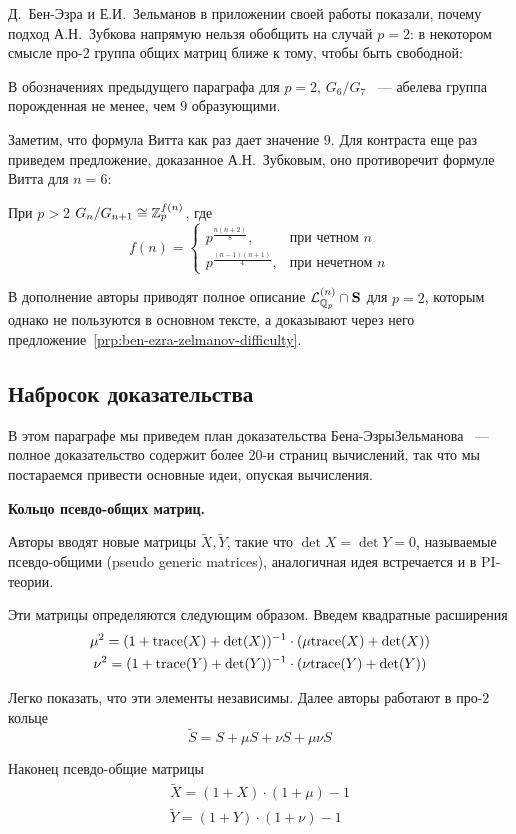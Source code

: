 Д.\ Бен-Эзра и Е.И.\ Зельманов в приложении своей работы показали, почему подход А.Н.\ Зубкова напрямую нельзя обобщить на случай $p=2$: в некотором смысле про-$2$ группа общих матриц ближе к тому, чтобы быть свободной:
\begin{proposition}
    \label{prp:ben-ezra-zelmanov-difficulty}
    В обозначениях предыдущего параграфа для $p=2$, $G_6 / G_7$ ~--- абелева группа порожденная не менее, чем $9$ образующими.
\end{proposition}
Заметим, что формула Витта как раз дает значение $9$.
Для контраста еще раз приведем предложение, доказанное А.Н.\ Зубковым, оно противоречит формуле Витта для $n=6$:
\begin{proposition}
    При $p>2$ $G_n / G_{n+1} \cong \mathbb{Z}_p^{f(n)}$, где\\
    \[
        f(n) =
        \begin{cases}
            p^{\frac{n(n+2)}{8}}, & \text{при четном $n$} \\
            p^{\frac{(n-1)(n+1)}{4}}, & \text{при нечетном $n$}
        \end{cases}
    \]
\end{proposition}

В дополнение авторы приводят полное описание $\mathcal{L}^{(n)}_{\mathbb{Q}_p} \cap \mathbf{S}$ для $p=2$, которым однако не пользуются в основном тексте, а доказывают через него предложение~\ref{prp:ben-ezra-zelmanov-difficulty}.

\subsection{Набросок доказательства}\label{subsec:ben-ezra-zelmanov-non-injective}
В этом параграфе мы приведем план доказательства Бена-Эзры\textemdash Зельманова ~--- полное доказательство содержит более 20-и страниц вычислений, так что мы постараемся привести основные идеи, опуская вычисления.

\vskip 0.1in\noindent
{\large\textbf{Кольцо псевдо-общих матриц.}}

Авторы вводят новые матрицы $\tilde{X}, \tilde{Y}$, такие что $\det X = \det Y = 0$, называемые псевдо-общими (pseudo generic matrices), аналогичная идея встречается и в PI-теории.

Эти матрицы определяются следующим образом.
Введем квадратные расширения
\begin{gather*}
    \mu^2 = (1 + \mathrm{trace}(X) + \det(X))^{-1} \cdot (\mu \mathrm{trace}(X) + \det(X))\\
    \nu^2 = (1 + \mathrm{trace}(Y) + \det(Y))^{-1} \cdot (\nu \mathrm{trace}(Y) + \det(Y))
\end{gather*}

Легко показать, что эти элементы независимы.
Далее авторы работают в про-$2$ кольце
\[
    \tilde{S} = S + \mu S + \nu S + \mu \nu S
\]

Наконец псевдо-общие матрицы
\begin{gather*}
    \tilde{X} = (1 + X) \cdot (1 + \mu) - 1 \\
    \tilde{Y} = (1 + Y) \cdot (1 + \nu) - 1
\end{gather*}

